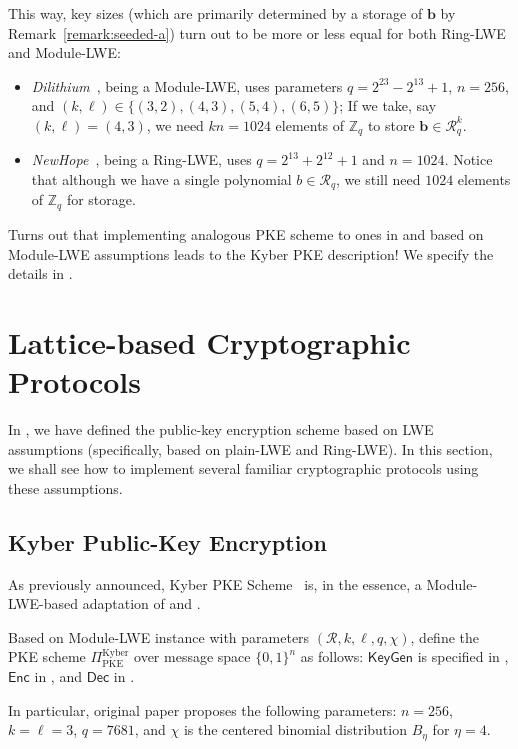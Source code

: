 \documentclass{template}
\begin{document}
This way, key sizes (which are primarily determined by a storage of $\mathbf{b}$
by Remark~\ref{remark:seeded-a}) turn out to be more or less equal for both
Ring-LWE and Module-LWE:
\begin{itemize}
    \item \textit{Dilithium}~\cite{dilithium}, being a Module-LWE, uses
    parameters $q=2^{23}-2^{13}+1$, $n=256$, and $(k,\ell) \in
    \{(3,2),(4,3),(5,4),(6,5)\}$; If we take, say $(k,\ell)=(4,3)$, we need $kn
    = 1024$ elements of $\mathbb{Z}_q$ to store $\mathbf{b} \in
    \mathcal{R}_q^{k}$.
    \item \textit{NewHope}~\cite{new-hope}, being a Ring-LWE, uses
    $q=2^{13}+2^{12}+1$ and $n=1024$. Notice that although we have a single
    polynomial $b \in \mathcal{R}_q$, we still need $1024$ elements of
    $\mathbb{Z}_q$ for storage.
\end{itemize}

Turns out that implementing analogous PKE scheme to ones in 
and  based on Module-LWE assumptions leads to the Kyber PKE
description! We specify the details in .

\section{Lattice-based Cryptographic Protocols}

In , we have defined the public-key encryption scheme based on
LWE assumptions (specifically, based on plain-LWE and Ring-LWE). In this
section, we shall see how to implement several familiar cryptographic protocols
using these assumptions.

\subsection{Kyber Public-Key Encryption}\label{section:kyber}

As previously announced, Kyber PKE Scheme~\cite{kyber} is, in the essence, a
Module-LWE-based adaptation of  and .

\begin{definition}\label{def:kyber} Based on Module-LWE instance with parameters
    $(\mathcal{R},k,\ell,q,\chi)$, define the PKE scheme
    $\Pi_{\text{PKE}}^{\text{Kyber}}$ over message space $\{0,1\}^n$ as follows:
    $\mathsf{KeyGen}$ is specified in , $\mathsf{Enc}$ in
    , and $\mathsf{Dec}$ in .

    In particular, original paper \cite{kyber} proposes the following
    parameters: $n=256$, $k=\ell=3$, $q=7681$, and $\chi$ is the centered
    binomial distribution $B_{\eta}$ for $\eta=4$.
\end{definition}
\end{document}
